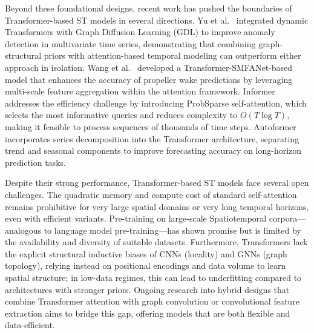 \documentclass[acmsmall]{acmart}
\begin{document}
Beyond these foundational designs, recent work has pushed the boundaries of Transformer-based ST models in several directions. Yu et al.~\cite{yu2025graph} integrated dynamic Transformers with Graph Diffusion Learning (GDL) to improve anomaly detection in multivariate time series, demonstrating that combining graph-structural priors with attention-based temporal modeling can outperform either approach in isolation. Wang et al.~\cite{wang2025propeller} developed a Transformer-SMFANet-based model that enhances the accuracy of propeller wake predictions by leveraging multi-scale feature aggregation within the attention framework. Informer \cite{zhou2021informer} addresses the efficiency challenge by introducing ProbSparse self-attention, which selects the most informative queries and reduces complexity to $O(T \log T)$, making it feasible to process sequences of thousands of time steps. Autoformer \cite{wu2021autoformer} incorporates series decomposition into the Transformer architecture, separating trend and seasonal components to improve forecasting accuracy on long-horizon prediction tasks.
 
Despite their strong performance, Transformer-based ST models face several open challenges. The quadratic memory and compute cost of standard self-attention remains prohibitive for very large spatial domains or very long temporal horizons, even with efficient variants. Pre-training on large-scale Spatiotemporal corpora—analogous to language model pre-training—has shown promise but is limited by the availability and diversity of suitable datasets. Furthermore, Transformers lack the explicit structural inductive biases of CNNs (locality) and GNNs (graph topology), relying instead on positional encodings and data volume to learn spatial structure; in low-data regimes, this can lead to underfitting compared to architectures with stronger priors. Ongoing research into hybrid designs that combine Transformer attention with graph convolution or convolutional feature extraction aims to bridge this gap, offering models that are both flexible and data-efficient.
 
\end{document}
